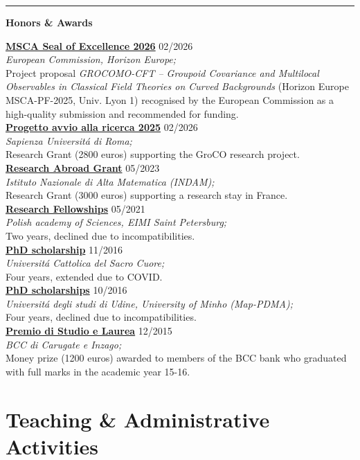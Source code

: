 \documentclass[a4paper]{article}
\newcommand{\block}[1]{\hrule \vspace{0.2cm} \textbf{\Large #1} \vspace{0.2cm}}
\newcommand{\voice}[5]{\href{#4}{\textbf{#1}} \hfill #2 \\ \textit{#3} \\ {\small #5} \vspace{0.2cm} \\}
\begin{document}

	\block{Honors \& Awards}

    
    \voice{MSCA Seal of Excellence 2026}
        {02/2026}
        {European Commission, Horizon Europe;}
        {https://www.dropbox.com/scl/fi/zr05hlqz8rpq4d9j51b7q/2602-MSCA-SealofExcellence.pdf?rlkey=ovu5ad8hmdjh9nkaqy8rmq3lb&st=wbag5jwb&dl=0}       
        {Project proposal \emph{GROCOMO-CFT – Groupoid Covariance and Multilocal Observables in Classical Field Theories on Curved Backgrounds} (Horizon Europe MSCA-PF-2025, Univ. Lyon 1) recognised by the European Commission as a high-quality submission and recommended for funding.}
    \voice{Progetto avvio alla ricerca 2025}
        {02/2026}
        {Sapienza Universit\'a di Roma;}
        {https://www.dropbox.com/scl/fi/sgragjrgzdtfesdmhm4bv/2602-AvvioRicerca-Grant.pdf?rlkey=6iplpssiva66zkdw7qna4wl0c&st=x8jty2x7&dl=0}       
        {Research Grant (2800 euros) supporting the GroCO research project.}
	\voice{Research Abroad Grant}
		{05/2023}
		{Istituto Nazionale di Alta Matematica (INDAM);}
		{https://www.altamatematica.it/wp-content/uploads/2022/12/bando-estero-2022-2023-1.pdf}       
		{Research Grant (3000 euros) supporting a research stay in France.}
	\voice{Research Fellowships}
		{05/2021}
		{Polish academy of Sciences, EIMI Saint Petersburg;}
		{}       
		{Two years, declined due to incompatibilities.}
	\voice{PhD scholarship}
		{11/2016}
		{Universit\'a Cattolica del Sacro Cuore;}
		{https://www.dropbox.com/s/pmsg20xsxd6x5yf/External_Scholarship.pdf?dl=0}       
		{Four years, extended due to COVID.}
	\voice{PhD scholarships}
		{10/2016}
		{Universit\'a degli studi di Udine, University of Minho (Map-PDMA);}
		{}       
		{Four years, declined due to incompatibilities.}
	\voice{Premio di Studio e Laurea}
		{12/2015}
		{BCC di Carugate e Inzago;}
		{https://web.archive.org/web/20191207203437/https://www.bccmilano.it/news/dettaglio_news_div.asp?i_menuID=54872&hNewsID=132411}       
		{Money prize (1200 euros) awarded to members of the BCC bank who graduated with full marks in the academic year 15-16.}

	\clearpage
	\section*{Teaching \& Administrative Activities}
\end{document}
